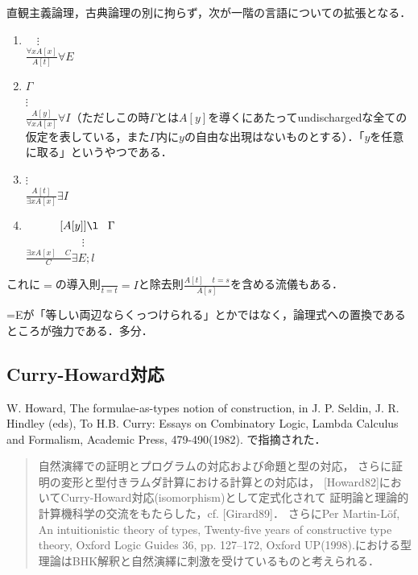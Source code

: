 \documentclass[uplatex, dvipdfmx]{jsreport}
\begin{document}
\begin{definition}
    直観主義論理，古典論理の別に拘らず，次が一階の言語についての拡張となる．
    \begin{enumerate}
        \item 　$\vdots$\\
        $\frac{\forall xA[x]}{A[t]}\forall E$
        \item $\Gamma$\\
        $\vdots$\\
        $\frac{A[y]}{\forall xA[x]}\forall I$（ただしこの時$\Gamma$とは$A[y]$を導くにあたってundischargedな全ての仮定を表している，また$\Gamma$内に$y$の自由な出現はないものとする）．「$y$を任意に取る」というやつである．
        \item $\vdots$\\
        $\frac{A[t]}{\exists xA[x]}\exists I$
        \item 　　　$[A[y]]\l\;\;\;\Gamma$\\
        　　　　　$\vdots$\\
        $\frac{\exists xA[x]\;\;\;\;C}{C}\exists E;l$
    \end{enumerate}
    これに$=$の導入則$\frac{}{t=t}=I$と除去則$\frac{A[t]\;\;\;\;t=s}{A[s]}$を含める流儀もある．
\end{definition}
\begin{remark}
    =Eが「等しい両辺ならくっつけられる」とかではなく，論理式への置換であるところが強力である．多分．
\end{remark}

\subsection{Curry-Howard対応}
W. Howard, The formulae-as-types notion of construction, in J. P. Seldin, J. R. Hindley (eds), To H.B. Curry: Essays on Combinatory Logic, Lambda Calculus and Formalism, Academic Press, 479-490(1982).
で指摘された．
\begin{quote}
    自然演繹での証明とプログラムの対応および命題と型の対応，
    さらに証明の変形と型付きラムダ計算における計算との対応は，
    [Howard82]においてCurry-Howard対応(isomorphism)として定式化されて
    証明論と理論的計算機科学の交流をもたらした，cf. [Girard89]．
    さらにPer Martin-Löf, An intuitionistic theory of types, Twenty-five years of constructive type theory, Oxford Logic Guides 36, pp. 127–172, Oxford UP(1998).における型理論はBHK解釈と自然演繹に刺激を受けているものと考えられる．
\end{quote}
\end{document}
